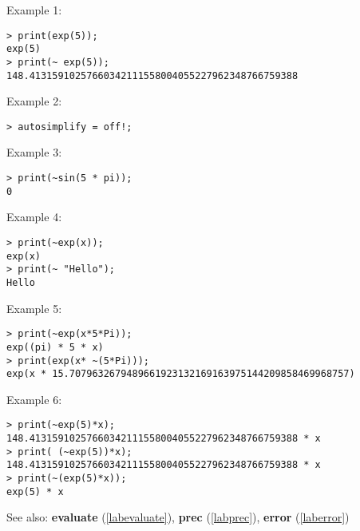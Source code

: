 \noindent Example 1: 
\begin{center}\begin{minipage}{15cm}\begin{Verbatim}[frame=single]
> print(exp(5));
exp(5)
> print(~ exp(5));
148.41315910257660342111558004055227962348766759388
\end{Verbatim}
\end{minipage}\end{center}
\noindent Example 2: 
\begin{center}\begin{minipage}{15cm}\begin{Verbatim}[frame=single]
> autosimplify = off!;
\end{Verbatim}
\end{minipage}\end{center}
\noindent Example 3: 
\begin{center}\begin{minipage}{15cm}\begin{Verbatim}[frame=single]
> print(~sin(5 * pi));
0
\end{Verbatim}
\end{minipage}\end{center}
\noindent Example 4: 
\begin{center}\begin{minipage}{15cm}\begin{Verbatim}[frame=single]
> print(~exp(x));
exp(x)
> print(~ "Hello");
Hello
\end{Verbatim}
\end{minipage}\end{center}
\noindent Example 5: 
\begin{center}\begin{minipage}{15cm}\begin{Verbatim}[frame=single]
> print(~exp(x*5*Pi));
exp((pi) * 5 * x)
> print(exp(x* ~(5*Pi)));
exp(x * 15.7079632679489661923132169163975144209858469968757)
\end{Verbatim}
\end{minipage}\end{center}
\noindent Example 6: 
\begin{center}\begin{minipage}{15cm}\begin{Verbatim}[frame=single]
> print(~exp(5)*x);
148.41315910257660342111558004055227962348766759388 * x
> print( (~exp(5))*x);
148.41315910257660342111558004055227962348766759388 * x
> print(~(exp(5)*x));
exp(5) * x
\end{Verbatim}
\end{minipage}\end{center}
See also: \textbf{evaluate} (\ref{labevaluate}), \textbf{prec} (\ref{labprec}), \textbf{error} (\ref{laberror})

